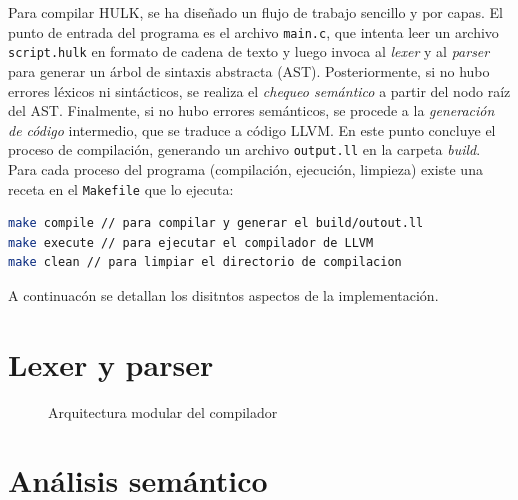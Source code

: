 \documentclass{llncs}
\begin{document}
Para compilar HULK, se ha diseñado un flujo de trabajo sencillo y por capas. El punto de entrada del programa es 
el archivo \texttt{main.c}, que intenta leer un archivo \texttt{script.hulk} en formato de cadena de texto y luego invoca al \textit{lexer} y al \textit{parser} para generar un árbol de sintaxis abstracta (AST). Posteriormente,
si no hubo errores léxicos ni sintácticos, se realiza el \textit{chequeo semántico} a partir del nodo raíz del AST. Finalmente, si no hubo errores semánticos, se procede a la \textit{generación de código} intermedio, que se traduce a código LLVM. En
este punto concluye el proceso de compilación, generando un archivo \texttt{output.ll} en la carpeta \textit{build}. Para cada proceso del programa (compilación, ejecución, limpieza) existe una receta en el \texttt{Makefile} que lo ejecuta: 
\begin{lstlisting}[language=bash]
make compile // para compilar y generar el build/outout.ll
make execute // para ejecutar el compilador de LLVM 
make clean // para limpiar el directorio de compilacion
\end{lstlisting}

A continuacón se detallan los disitntos aspectos de la implementación.
\vspace{10pt}
\section{Lexer y parser}


\begin{figure}[h]
\centering
\caption{Arquitectura modular del compilador}
\label{fig:arquitectura}
\end{figure}

\vspace{10pt}
\section{Análisis semántico}
\end{document}
